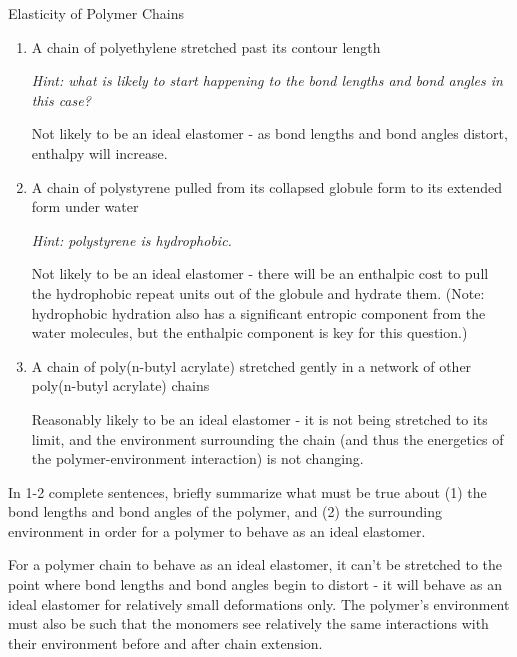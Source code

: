 \begin{activity}{Elasticity of Polymer Chains}
\begin{ctqs}
		\begin{enumerate}
			\item A chain of polyethylene stretched past its contour length
			
				\emph{Hint: what is likely to start happening to the bond lengths and bond angles in this case?}
		
				\begin{solution}[1in]
					Not likely to be an ideal elastomer - as bond lengths and bond angles distort, enthalpy will increase.
				\end{solution}
				
			\item A chain of polystyrene pulled from its collapsed globule form to its extended form under water
			
				\emph{Hint: polystyrene is hydrophobic.}
		
				\begin{solution}[01in]
					Not likely to be an ideal elastomer - there will be an enthalpic cost to pull the hydrophobic repeat units out of the globule and hydrate them.  (Note: hydrophobic hydration also has a significant entropic component from the water molecules, but the enthalpic component is key for this question.)
				\end{solution}
			
			\item A chain of poly(n-butyl acrylate) stretched gently in a network of other poly(n-butyl acrylate) chains
		
				\begin{solution}[01in]
					Reasonably likely to be an ideal elastomer - it is not being stretched to its limit, and the environment surrounding the chain (and thus the energetics of the polymer-environment interaction) is not changing.
				\end{solution}
		\end{enumerate}	
	
	\question In 1-2 complete sentences, briefly summarize what must be true about (1) the bond lengths and bond angles of the polymer, and (2) the surrounding environment in order for a polymer to behave as an ideal elastomer.
		
		\begin{solution}[1.5in]
			For a polymer chain to behave as an ideal elastomer, it can't be stretched to the point where bond lengths and bond angles begin to distort - it will behave as an ideal elastomer for relatively small deformations only.  The polymer's environment must also be such that the monomers see relatively the same interactions with their environment before and after chain extension.
		\end{solution}


\end{ctqs}
\end{activity}
